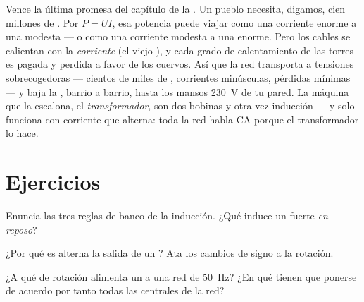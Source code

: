 \begin{remark}\label{rem:g9:alternator:transport}
Vence la última promesa del capítulo de la . Un pueblo
necesita, digamos, cien millones de . Por $P = U I$, esa
potencia puede viajar como una corriente enorme a una
 modesta --- o como una corriente modesta a una
 enorme. Pero los cables se calientan con la
\emph{corriente} (el viejo ), y cada grado de
calentamiento de las torres es  pagada y perdida a favor de
los cuervos. Así que la red transporta a tensiones
sobrecogedoras --- cientos de miles de , corrientes
minúsculas, pérdidas mínimas --- y baja la , barrio a
barrio, hasta los mansos \qty{230}{V} de tu pared. La máquina que la
escalona, el \emph{transformador}, son dos bobinas y otra vez
inducción --- y solo funciona con corriente que alterna: toda la red
habla CA porque el transformador lo hace.
\end{remark}

\section{Ejercicios}

\begin{exercise}[$\star$]\label{exo:g9:alternator:1}
Enuncia las tres reglas de banco de la inducción. ¿Qué induce un
 fuerte \emph{en reposo}?
\end{exercise}

\begin{exercise}[$\star$]\label{exo:g9:alternator:2}
¿Por qué es alterna la salida de un ? Ata los cambios de
signo a la rotación.
\end{exercise}

\begin{exercise}[$\star$]\label{exo:g9:alternator:3}
¿A qué  de rotación alimenta un  a una
red de \qty{50}{Hz}? ¿En qué tienen que ponerse de acuerdo por tanto
todas las centrales de la red?
\end{exercise}

